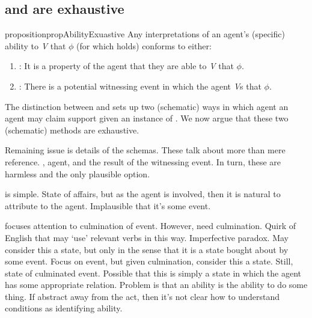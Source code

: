\subsection{\AR{} and \WR{} are exhaustive}
\label{sec:ability-exhaustive}

\begin{note}[Exhaustive]
    \begin{restatable}[]{proposition}{propAbilityExuastive}\label{prop:WR-and-AR-exhaustive}\label{either-AR-or-WR}
    Any interpretations of an agent's (specific) ability to \emph{V} that \(\phi\) (for which  holds) conforms to either:
    \begin{enumerate}
    \item \AR{}: It is a property of the agent that they are able to \emph{V} that \(\phi\).
    \item \WR{}: There is a potential witnessing event in which the agent \emph{V}s that \(\phi\).
    \end{enumerate}
    \vspace{-\baselineskip}
  \end{restatable}
\end{note}

\begin{note}
  The distinction between \AR{} and \WR{} sets up two (schematic) ways in which agent an agent may claim support given an instance of .
  We now argue that these two (schematic) methods are exhaustive.
\end{note}

\begin{note}
  Remaining issue is details of the schemas.
  These talk about more than mere reference.
  \AR{}, agent, and \WR{} the result of the witnessing event.
  In turn, these are harmless and the only plausible option.

  \AR{} is simple.
  State of affairs, but as the agent is involved, then it is natural to attribute to the agent.
  Implausible that it's some event.

  \WR{} focuses attention to culmination of event.
  However, need culmination.
  Quirk of English that may `use' relevant verbs in this way.
  Imperfective paradox.
  May consider this a state, but only in the sense that it is a state bought about by some event.
  Focus on event, but given culmination, consider this a state.
  Still, state of culminated event.
  Possible that this is simply a state in which the agent has some appropriate relation.
  Problem is that an ability is the ability to do some thing.
  If abstract away from the act, then it's not clear how to understand conditions as identifying ability.
\end{note}

